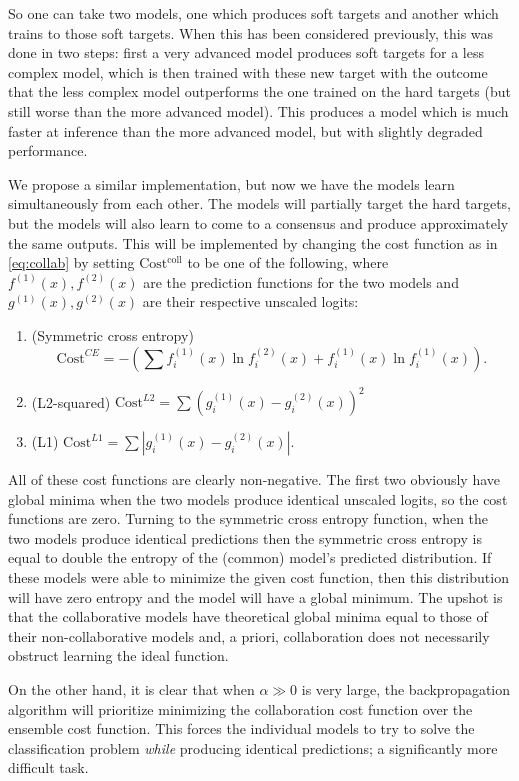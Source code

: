 \documentclass[english,a4paper,oneside]{amsart}
\theoremstyle{definition}
\begin{document}
So one can take two models, one which produces soft targets and another which trains to those soft targets. When this has been considered previously, this was done in two steps: first a very advanced model produces soft targets for a less complex model, which is then trained with these new target with the outcome that the less complex model outperforms the one trained on the hard targets (but still worse than the more advanced model).  This produces a model which is much faster at inference than the more advanced model, but with slightly degraded performance. 

We propose a similar implementation, but now we have the models learn simultaneously from each other. The models will partially target the hard targets, but the models will also learn to come to a consensus and produce approximately the same outputs.  This will be implemented by changing the cost function as in \eqref{eq:collab} by setting $\mathrm{Cost^{coll}}$ to be one of the following, where $f^{(1)}(x), f^{(2)}(x)$ are the prediction functions for the two models and $g^{(1)}(x), g^{(2)}(x)$ are their respective unscaled logits:
\begin{enumerate}
	\item (Symmetric cross entropy) \[\mathrm{Cost}^{CE}=-\left(\sum f^{(1)}_i(x)\ln f^{(2)}_i(x)+f^{(1)}_i(x)\ln f^{(1)}_i(x)\right).\]
	\item (L2-squared) $\mathrm{Cost}^{L2}=\sum (g_i^{(1)}(x)-g_i^{(2)}(x))^2$
	\item (L1) $\mathrm{Cost}^{L1}=\sum |g_i^{(1)}(x)-g_i^{(2)}(x)|.$
\end{enumerate}

All of these cost functions are clearly non-negative. The first two obviously have global minima when the two models produce identical unscaled logits, so the cost functions are zero. Turning to the symmetric cross entropy function, when the two models produce identical predictions then the symmetric cross entropy is equal to double the entropy of the (common) model's predicted distribution. If these models were able to minimize the given cost function, then this distribution will have zero entropy and the model will have a global minimum. The upshot is that the collaborative models have theoretical global minima equal to those of their  non-collaborative models and, a priori, collaboration does not necessarily obstruct learning the ideal function.

On the other hand, it is clear that when $\alpha \gg 0$ is very large, the backpropagation algorithm will prioritize minimizing the collaboration cost function over the ensemble cost function. This forces the individual models to try to solve the classification problem \emph{while} producing identical predictions; a significantly more difficult task.
\end{document}
